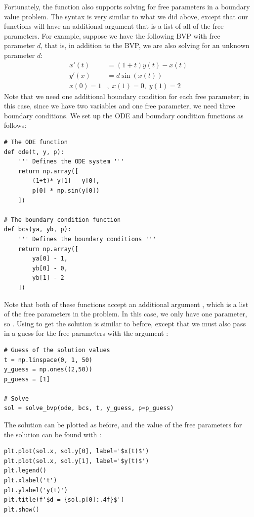 Fortunately, the function  also supports solving for free parameters in a boundary value problem.
The syntax is very similar to what we did above, except that our functions will have an additional argument that is a list of all of the free parameters.
For example, suppose we have the following BVP with free parameter \(d\), that is, in addition to the BVP, we are also solving for an unknown parameter \(d\):
\begin{align*}
x'(t) &= (1+t)y(t)-x(t) \\
y'(x) &= d\sin(x(t))
\\
x(0)=1&,\; x(1)=0,\; y(1)=2
\end{align*}
Note that we need one additional boundary condition for each free parameter; in this case, since we have two variables and one free parameter, we need three boundary conditions.
We set up the ODE and boundary condition functions as follows:
\begin{lstlisting}
# The ODE function
def ode(t, y, p):
    ''' Defines the ODE system '''
    return np.array([
        (1+t)* y[1] - y[0],
        p[0] * np.sin(y[0])
    ])

# The boundary condition function
def bcs(ya, yb, p):
    ''' Defines the boundary conditions '''
    return np.array([
        ya[0] - 1,
        yb[0] - 0,
        yb[1] - 2
    ])
\end{lstlisting}
Note that both of these functions accept an additional argument , which is a list of the free parameters in the problem.
In this case, we only have one parameter, so .
Using  to get the solution is similar to before, except that we must also pass in a guess for the free parameters with the argument :
\begin{lstlisting}
# Guess of the solution values
t = np.linspace(0, 1, 50)
y_guess = np.ones((2,50))
p_guess = [1]

# Solve
sol = solve_bvp(ode, bcs, t, y_guess, p=p_guess)
\end{lstlisting}
The solution can be plotted as before, and the value of the free parameters for the solution can be found with :
\begin{lstlisting}
plt.plot(sol.x, sol.y[0], label='$x(t)$')
plt.plot(sol.x, sol.y[1], label='$y(t)$')
plt.legend()
plt.xlabel('t')
plt.ylabel('y(t)')
plt.title(f'$d = {sol.p[0]:.4f}$')
plt.show()
\end{lstlisting}

